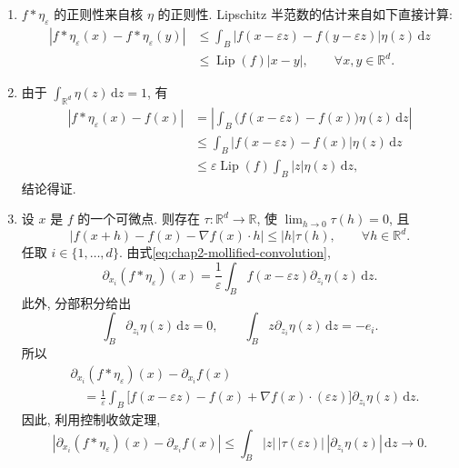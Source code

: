 \begin{Proof}
\begin{enumerate}
\item $f*\eta_\varepsilon$ 的正则性来自核 $\eta$ 的正则性. Lipschitz 半范数的估计来自如下直接计算:
\begin{align*}
|f*\eta_\varepsilon(x)-f*\eta_\varepsilon(y)|
&\leq\int_B|f(x-\varepsilon z)-f(y-\varepsilon z)|\eta(z)\,\mathrm{d}z\\
&\leq\operatorname{Lip}(f)|x-y|,
\qquad\forall x,y\in\mathbb{R}^d.
\end{align*}

\item 由于 $\int_{\mathbb{R}^d}\eta(z)\,\mathrm{d}z=1$, 有
\begin{align*}
|f*\eta_\varepsilon(x)-f(x)|
&=\left|\int_B\bigl(f(x-\varepsilon z)-f(x)\bigr)\eta(z)\,\mathrm{d}z\right|\\
&\leq\int_B|f(x-\varepsilon z)-f(x)|\eta(z)\,\mathrm{d}z\\
&\leq\varepsilon\operatorname{Lip}(f)\int_B|z|\eta(z)\,\mathrm{d}z,
\end{align*}
结论得证.

\item 设 $x$ 是 $f$ 的一个可微点. 则存在 $\tau:\mathbb{R}^d\to\mathbb{R}$, 使 $\lim_{h\to0}\tau(h)=0$, 且
\[
  |f(x+h)-f(x)-\nabla f(x)\cdot h|
  \leq|h|\tau(h),
  \qquad\forall h\in\mathbb{R}^d.
\]
任取 $i\in\{1,\ldots,d\}$. 由式\eqref{eq:chap2-mollified-convolution},
\[
  \partial_{x_i}(f*\eta_\varepsilon)(x)
  =\frac1\varepsilon\int_B f(x-\varepsilon z)\partial_{z_i}\eta(z)\,\mathrm{d}z.
\]
此外, 分部积分给出
\[
  \int_B\partial_{z_i}\eta(z)\,\mathrm{d}z=0,
  \qquad
  \int_B z\partial_{z_i}\eta(z)\,\mathrm{d}z=-e_i.
\]
所以
\begin{align*}
&\partial_{x_i}(f*\eta_\varepsilon)(x)-\partial_{x_i}f(x)\\
&\quad=\frac1\varepsilon\int_B
\bigl[f(x-\varepsilon z)-f(x)+\nabla f(x)\cdot(\varepsilon z)\bigr]
\partial_{z_i}\eta(z)\,\mathrm{d}z.
\end{align*}
因此, 利用控制收敛定理,
\[
|\partial_{x_i}(f*\eta_\varepsilon)(x)-\partial_{x_i}f(x)|
\leq\int_B|z|\,|\tau(\varepsilon z)|\,|\partial_{z_i}\eta(z)|\,\mathrm{d}z
\longrightarrow0.
\]
\end{enumerate}
\end{Proof}

